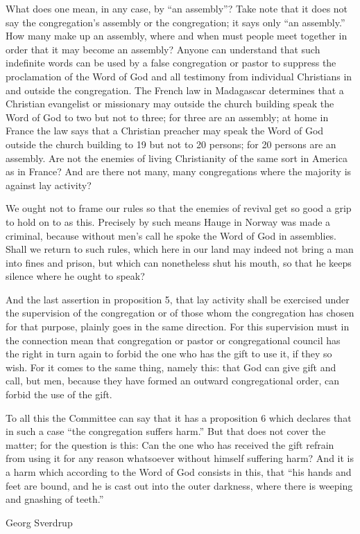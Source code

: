 What does one mean, in any case, by “an assembly”? Take note that it does not say the congregation’s assembly or the congregation; it says only “an assembly.” How many make up an assembly, where and when must people meet together in order that it may become an assembly? Anyone can understand that such indefinite words can be used by a false congregation or pastor to suppress the proclamation of the Word of God and all testimony from individual Christians in and outside the congregation. The French law in Madagascar determines that a Christian evangelist or missionary may outside the church building speak the Word of God to two but not to three; for three are an assembly; at home in France the law says that a Christian preacher may speak the Word of God outside the church building to 19 but not to 20 persons; for 20 persons are an assembly. Are not the enemies of living Christianity of the same sort in America as in France? And are there not many, many congregations where the majority is against lay activity?

We ought not to frame our rules so that the enemies of revival get so good a grip to hold on to as this. Precisely by such means Hauge in Norway was made a criminal, because without men’s call he spoke the Word of God in assemblies. Shall we return to such rules, which here in our land may indeed not bring a man into fines and prison, but which can nonetheless shut his mouth, so that he keeps silence where he ought to speak?

And the last assertion in proposition 5, that lay activity shall be exercised under the supervision of the congregation or of those whom the congregation has chosen for that purpose, plainly goes in the same direction. For this supervision must in the connection mean that congregation or pastor or congregational council has the right in turn again to forbid the one who has the gift to use it, if they so wish. For it comes to the same thing, namely this: that God can give gift and call, but men, because they have formed an outward congregational order, can forbid the use of the gift.

To all this the Committee can say that it has a proposition 6 which declares that in such a case “the congregation suffers harm.” But that does not cover the matter; for the question is this: Can the one who has received the gift refrain from using it for any reason whatsoever without himself suffering harm? And it is a harm which according to the Word of God consists in this, that “his hands and feet are bound, and he is cast out into the outer darkness, where there is weeping and gnashing of teeth.”

Georg Sverdrup
